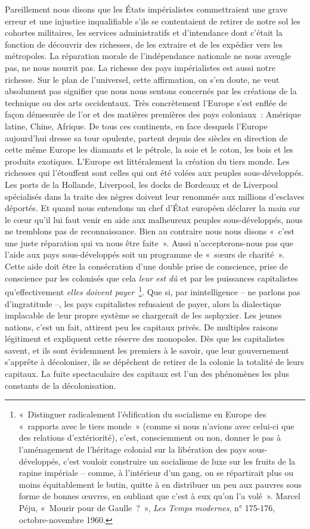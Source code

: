 \documentclass[french,twoside]{book} %
\begin{document}
\bigbreak
\noindent Pareillement nous disons que les États impérialistes commettraient une grave erreur et une injustice inqualifiable s’ils se contentaient de retirer de notre sol les cohortes militaires, les services administratifs et d’intendance dont c’était la fonction de découvrir des richesses, de les extraire et de les expédier vers les métropoles. La réparation morale de l’indépendance nationale ne nous aveugle pas, ne nous nourrit pas. La richesse des pays impérialistes est aussi notre richesse. Sur le plan de l’universel, cette affirmation, on s’en doute, ne veut absolument pas signifier que nous nous sentons concernés par les créations de la technique ou des arts occidentaux. Très concrètement l’Europe s’est enflée de façon démesurée de l’or et des matières premières des pays coloniaux : Amérique latine, Chine, Afrique. De tous ces continents, en face desquels l’Europe aujourd’hui dresse sa tour opulente, partent depuis des siècles en direction de cette même Europe les diamants et le pétrole, la soie et le coton, les bois et les produits exotiques. L’Europe est littéralement la création du tiers monde. Les richesses qui l’étouffent   sont celles qui ont été volées aux peuples sous-développés. Les ports de la Hollande, Liverpool, les docks de Bordeaux et de Liverpool spécialisés dans la traite des nègres doivent leur renommée aux millions d’esclaves déportés. Et quand nous entendons un chef d’État européen déclarer la main sur le cœur qu’il lui faut venir en aide aux malheureux peuples sous-développés, nous ne tremblons pas de reconnaissance. Bien au contraire nous nous disons « c’est une juste réparation qui va nous être faite ». Aussi n’accepterons-nous pas que l’aide aux pays sous-développés soit un programme de « sœurs de charité ». Cette aide doit être la consécration d’une double prise de conscience, prise de conscience par les colonisés que cela \emph{leur est dû} et par les puissances capitalistes qu’effectivement \emph{elles doivent payer} \footnote{« Distinguer radicalement l’édification du socialisme en Europe des « rapports avec le tiers monde » (comme si nous n’avions avec celui-ci que des relations d’extériorité), c’est, consciemment ou non, donner le pas à l’aménagement de l’héritage colonial sur la libération des pays sous-développés, c’est vouloir construire un socialisme de luxe sur les fruits de la rapine impériale – comme, à l’intérieur d’un gang, on se répartirait plus ou moins équitablement le butin, quitte à en distribuer un peu aux pauvres sous forme de bonnes œuvres, en oubliant que c’est à eux qu’on l’a volé ». Marcel Péju, « Mourir pour de Gaulle ? », \emph{Les Temps modernes}, n° 175-176, octobre-novembre 1960.}. Que si, par inintelligence – ne parlons pas d’ingratitude –, les pays capitalistes refusaient de payer, alors la dialectique implacable de leur propre système se chargerait de les asphyxier. Les jeunes nations, c’est un fait, attirent peu les capitaux privés. De multiples raisons légitiment et expliquent cette réserve des monopoles. Dès que les capitalistes savent, et ils sont évidemment les premiers à le savoir, que leur gouvernement s’apprête à décoloniser, ils se dépêchent de retirer de la colonie la totalité de leurs capitaux. La fuite spectaculaire des capitaux est l’un des phénomènes les plus constants de la décolonisation.\par
\end{document}
